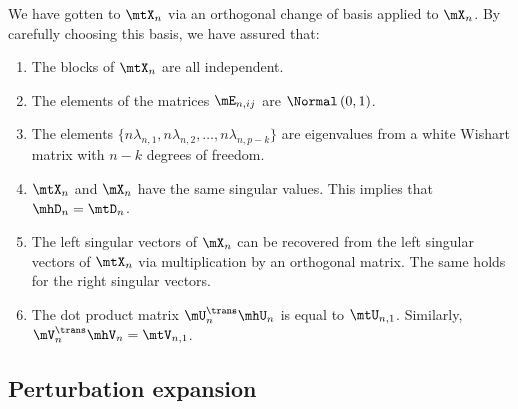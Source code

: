We have gotten to $\mtX_n$ via an orthogonal change of basis applied to $\mX_n$.  By carefully choosing this basis, we have assured that:
\begin{enumerate}
    \item The blocks of $\mtX_n$ are all independent.
    \item The elements of the matrices $\mE_{n,ij}$ are 
        \iid $\Normal\left( 0, 1 \right)$.
    \item The elements 
        $\{ n \lambda_{n,1}, n \lambda_{n,2}, \ldots, 
            n \lambda_{n,p-k} \}$ are eigenvalues from
        a white Wishart matrix with $n-k$ degrees of freedom.
    \item $\mtX_n$ and $\mX_n$ have the same singular values.  This implies
        that $\mhD_n = \mtD_n$.
    \item The left singular vectors of $\mX_n$ can be recovered from the
        left singular vectors of $\mtX_n$ via multiplication by an orthogonal
        matrix.  The same holds for the right singular vectors.
    \item The dot product matrix $\mU_n^\trans \mhU_n$ is equal to
        $\mtU_{n,1}$.
        Similarly, $\mV_n^\trans \mhV_n = \mtV_{n,1}$.
\end{enumerate}

\subsection{Perturbation expansion}

